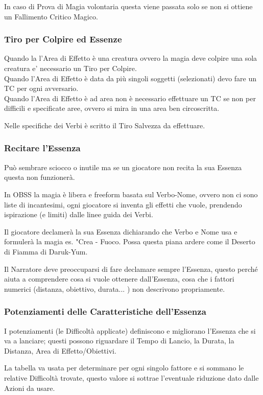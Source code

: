 \documentclass[a4paper,twoside,openany]{book}
\begin{document}
\begin{multicols}{2}
In caso di Prova di Magia volontaria questa viene passata solo se non si ottiene un Fallimento Critico Magico.

\subsubsection{Tiro per Colpire ed Essenze}

Quando la l'Area di Effetto è una creatura ovvero la magia deve colpire una sola creatura e' necessario un Tiro per Colpire.\\
Quando l'Area di Effetto è data da più singoli soggetti (selezionati) devo fare un TC per ogni avversario.\\
Quando l'Area di Effetto è ad area non è necessario effettuare un TC se non per difficili e specificate aree, ovvero si mira in una area ben circoscritta.

Nelle specifiche dei Verbi è scritto il Tiro Salvezza da effettuare.

\subsubsection{Recitare l'Essenza}

\label{recitare-lessenza}

Può sembrare sciocco o inutile ma se un giocatore non recita la sua Essenza questa non funzionerà.

In OBSS la magia è libera e freeform basata sul Verbo-Nome, ovvero non ci sono liste di incantesimi, ogni giocatore si inventa gli effetti che vuole, prendendo ispirazione (e limiti) dalle linee guida dei Verbi.

Il giocatore declamerà la sua Essenza dichiarando che Verbo e Nome usa e formulerà la magia es. "Crea - Fuoco. Possa questa piana ardere come il Deserto di Fiamma di Daruk-Yum.

Il Narratore deve preoccuparsi di fare declamare sempre l'Essenza, questo perché aiuta a comprendere cosa si vuole ottenere dall'Essenza, cosa che i fattori numerici (distanza, obiettivo, durata... ) non descrivono propriamente.

\subsubsection{Potenziamenti delle Caratteristiche dell'Essenza}

\label{potenziamenti-delle-caratteristiche-dellessenza}

I potenziamenti (le Difficoltà applicate) definiscono e migliorano l'Essenza che si va a lanciare; questi possono riguardare il Tempo di Lancio, la Durata, la Distanza, Area di Effetto/Obiettivi.

La tabella va usata per determinare per ogni singolo fattore e si sommano le relative Difficoltà trovate, questo valore si sottrae l'eventuale riduzione dato dalle Azioni da usare.

\end{multicols}
\end{document}
